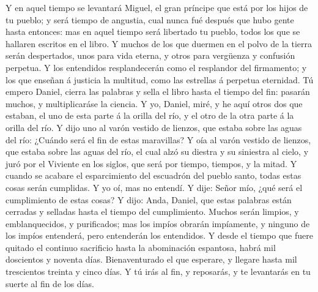  Y en aquel tiempo se levantará Miguel, el gran príncipe
que está por los hijos de tu pueblo; y será tiempo de angustia, cual
nunca fué después que hubo gente hasta entonces: mas en aquel tiempo
será libertado tu pueblo, todos los que se hallaren escritos en el
libro.  Y muchos de los que duermen en el polvo de la
tierra serán despertados, unos para vida eterna, y otros para vergüenza
y confusión perpetua.  Y los entendidos resplandecerán
como el resplandor del firmamento; y los que enseñan á justicia la
multitud, como las estrellas á perpetua eternidad.  Tú
empero Daniel, cierra las palabras y sella el libro hasta el tiempo del
fin: pasarán muchos, y multiplicaráse la ciencia.  Y yo,
Daniel, miré, y he aquí otros dos que estaban, el uno de esta parte á la
orilla del río, y el otro de la otra parte á la orilla del río.
 Y dijo uno al varón vestido de lienzos, que estaba sobre
las aguas del río: ¿Cuándo será el fin de estas maravillas?
 Y oía al varón vestido de lienzos, que estaba sobre las
aguas del río, el cual alzó su diestra y su siniestra al cielo, y juró
por el Viviente en los siglos, que será por tiempo, tiempos, y la mitad.
Y cuando se acabare el esparcimiento del escuadrón del pueblo santo,
todas estas cosas serán cumplidas.  Y yo oí, mas no
entendí. Y dije: Señor mío, ¿qué será el cumplimiento de estas cosas?
 Y dijo: Anda, Daniel, que estas palabras están cerradas y
selladas hasta el tiempo del cumplimiento.  Muchos serán
limpios, y emblanquecidos, y purificados; mas los impíos obrarán
impíamente, y ninguno de los impíos entenderá, pero entenderán los
entendidos.  Y desde el tiempo que fuere quitado el
continuo sacrificio hasta la abominación espantosa, habrá mil doscientos
y noventa días.  Bienaventurado el que esperare, y
llegare hasta mil trescientos treinta y cinco días.  Y tú
irás al fin, y reposarás, y te levantarás en tu suerte al fin de los
días.
